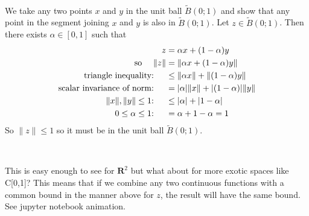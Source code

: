 \documentclass{article}
\newcommand{\R}{\textbf{R}}
\newcommand{\norm}[1]{ \lVert #1 \rVert }
\begin{document}
\

We take any two points $x$ and $y$ in the unit ball $\tilde{B}(0;1)$ 
and show that any point in the segment joining $x$ and $y$ is also
in $\tilde{B}(0;1)$.
Let $z \in \tilde{B}(0;1)$.
Then there exists $\alpha \in [0,1]$ such that
\begin{align*}
  z &= \alpha x + (1-\alpha) y \\
  \text{so \quad} \norm{z} &= \norm{ \alpha x + (1-\alpha) y } \\
  \text{triangle inequality: \quad} & \leq \norm{ \alpha x } + \norm{ (1-\alpha) y } \\
  \text{scalar invariance of norm: \quad} &= |\alpha| \norm{ x } + |(1-\alpha)|  \norm{ y } \\
  \text{$\norm{x}, \norm{y} \leq 1$: \quad} &\leq |\alpha| + |1-\alpha| \\
  \text{$0 \leq \alpha \leq 1$: \quad} & = \alpha + 1 - \alpha = 1
\end{align*}
So $\norm{z} \leq 1$ so it must be in the unit ball $\tilde{B}(0;1)$.

\

This is easy enough to see for $\R^2$ but what about for more exotic
spaces like C[0,1]?
This means that if we combine any two continuous functions with a common bound 
in the manner above for $z$,
the result will have the same bound.
See jupyter notebook animation. 
\end{document}
